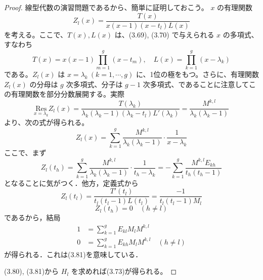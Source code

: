 \begin{story}
\begin{proof}
線型代数の演習問題であるから、簡単に証明しておこう。
$x$ の有理関数
\begin{equation}
    Z_l(x) = \frac{T(x)}{x(x-1)(x-t_l)L(x)}
\end{equation}
を考える。ここで、$T(x), L(x)$ は、(3.69), (3.70) で与えられる $x$ の多項式、すなわち
\begin{equation*}
    T(x) = x(x-1)\prod_{m=1}^g (x-t_m), \quad L(x) = \prod_{k=1}^g (x-\lambda_k)
\end{equation*}
である。$Z_l(x)$ は $x=\lambda_k \ (k=1, \cdots, g)$ に、1位の極をもつ。さらに、有理関数 $Z_l(x)$ の分母は $g$ 次多項式、分子は $g-1$ 次多項式、であることに注意してこの有理関数を部分分数展開する。実際
\begin{equation*}
    \underset{x=\lambda_k}{\mathrm{Res}} Z_l(x) = \frac{T(\lambda_k)}{\lambda_k(\lambda_k-1)(\lambda_k-t_l)L'(\lambda_k)} = \frac{M^{k,l}}{\lambda_k(\lambda_k-1)}
\end{equation*}
より、次の式が得られる。
\begin{equation}
    Z_l(x) = \sum_{k=1}^g \frac{M^{k,l}}{\lambda_k(\lambda_k-1)} \cdot \frac{1}{x-\lambda_k}
\end{equation}
ここで、まず
\begin{equation*}
    Z_l(t_h) = \sum_{k=1}^g \frac{M^{k,l}}{\lambda_k(\lambda_k-1)} \cdot \frac{1}{t_h-\lambda_k} = - \sum_{k=1}^g \frac{M^{k,l} E_{kh}}{t_h(t_h-1)}
\end{equation*}
となることに気がつく．他方，定義式から
\begin{equation*}
    Z_l(t_l) = \frac{T'(t_l)}{t_l(t_l-1)L(t_l)} = \frac{-1}{t_l(t_l-1)M_l}
\end{equation*}
\begin{equation*}
    Z_l(t_h) = 0 \quad (h \neq l)
\end{equation*}
であるから，結局
\begin{align*}
    1 &= \sum_{k=1}^g E_{kl} M_l M^{k,l} \\
    0 &= \sum_{k=1}^g E_{kh} M_l M^{k,l} \quad (h \neq l)
\end{align*}
が得られる．これは(3.81)を意味している．

(3.80), (3.81)から $H_l$ を求めれば(3.73)が得られる。
\end{proof}
\end{story}

